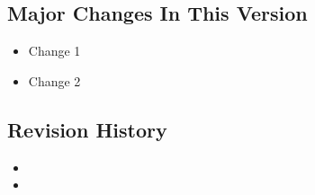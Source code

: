 
\OTHTChangesFromPreviousVersion

\subsection{Major Changes In This Version}

\begin{itemize}
  \item Change 1
  \item Change 2
\end{itemize}

\subsection{Revision History}

\begin{itemize}
  \item < Date in yyyy-mm-dd format >
  \item < Date in yyyy-mm-dd format >
\end{itemize}
